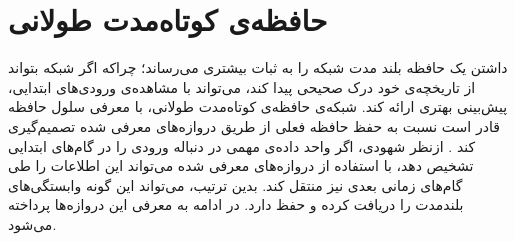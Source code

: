 \section{حافظه‌ی کوتاه‌مدت طولانی}
داشتن یک حافظه بلند مدت شبکه را به ثبات بیشتری می‌رساند؛ چراکه اگر شبکه بتواند از تاریخچه‌ی خود درک صحیحی پیدا کند، می‌تواند با مشاهده‌ی ورودی‌های ابتدایی، پیش‌بینی بهتری ارائه کند. شبکه‌ی حافظه‌ی کوتاه‌مدت طولانی، با معرفی سلول حافظه قادر است نسبت به حفظ حافظه فعلی از طریق دروازه‌های معرفی شده تصمیم‌گیری کند \cite{lstm}. ازنظر شهودی، اگر واحد  داده‌ی مهمی در دنباله ورودی را در گام‌های ابتدایی تشخیص دهد، با استفاده از دروازه‌های معرفی شده می‌تواند این اطلاعات را طی گام‌های زمانی بعدی نیز منتقل کند. بدین ترتیب،  می‌تواند این گونه وابستگی‌های بلندمدت را دریافت کرده و حفظ دارد. در ادامه به معرفی این دروازه‌ها پرداخته می‌شود.


